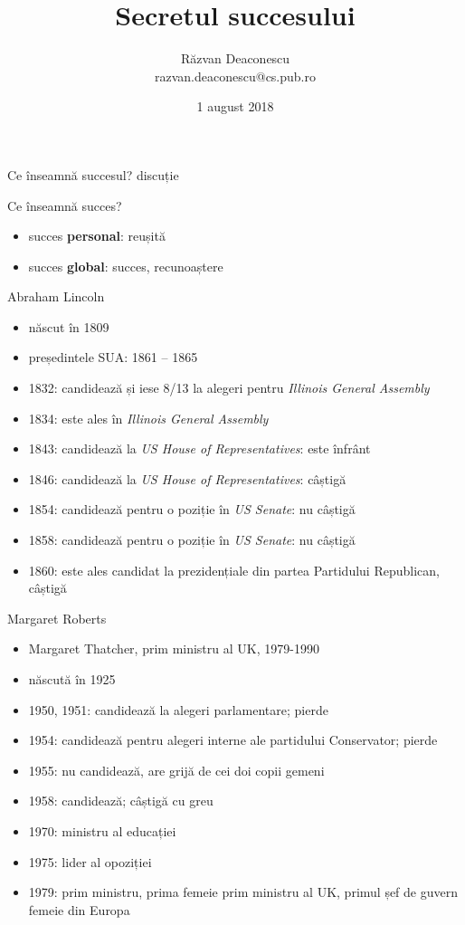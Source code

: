 \documentclass{simple}
\title[Secretul succesului]{Secretul succesului}
\institute{InfoEducație 2018 (Gălăciuc, Vrancea)}
\author[Răzvan Deaconescu]{Răzvan Deaconescu \\
razvan.deaconescu@cs.pub.ro}
\date{1 august 2018}
\begin{document}
\frame{\titlepage}

\begin{frame}{Ce înseamnă succesul?}
  \centering
  \Large{discuție}
\end{frame}

\begin{frame}{Ce înseamnă succes?}
  \begin{itemize}
    \pause \item succes \textbf{personal}: reușită
    \pause \item succes \textbf{global}: succes, recunoaștere
  \end{itemize}
\end{frame}

\begin{frame}{Abraham Lincoln}
  \begin{itemize}
    \pause \item născut în 1809
    \pause \item președintele SUA: 1861 -- 1865
    \pause \item 1832: candidează și iese 8/13 la alegeri pentru \textit{Illinois General Assembly}
    \pause \item 1834: este ales în \textit{Illinois General Assembly}
    \pause \item 1843: candidează la \textit{US House of Representatives}: este înfrânt
    \pause \item 1846: candidează la \textit{US House of Representatives}: câștigă
    \pause \item 1854: candidează pentru o poziție în \textit{US Senate}: nu câștigă
    \pause \item 1858: candidează pentru o poziție în \textit{US Senate}: nu câștigă
    \pause \item 1860: este ales candidat la prezidențiale din partea Partidului Republican, câștigă
  \end{itemize}
\end{frame}

\begin{frame}{Margaret Roberts}
  \begin{itemize}
    \pause \item Margaret Thatcher, prim ministru al UK, 1979-1990
    \pause \item născută în 1925
    \pause \item 1950, 1951: candidează la alegeri parlamentare; pierde
    \pause \item 1954: candidează pentru alegeri interne ale partidului Conservator; pierde
    \pause \item 1955: nu candidează, are grijă de cei doi copii gemeni
    \pause \item 1958: candidează; câștigă cu greu
    \pause \item 1970: ministru al educației
    \pause \item 1975: lider al opoziției
    \pause \item 1979: prim ministru, prima femeie prim ministru al UK, primul șef de guvern femeie din Europa
  \end{itemize}
\end{frame}
\end{document}
